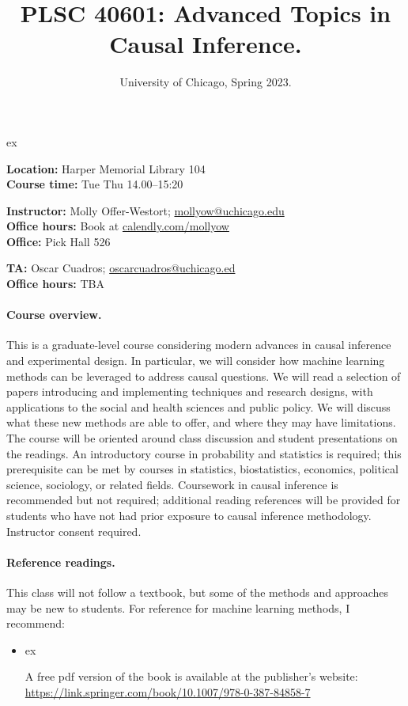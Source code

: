 \documentclass[letterpaper, 12pt, parskip=full,DIV=10]{scrartcl}
\title{PLSC 40601: Advanced Topics in Causal Inference.}
\subtitle{University of Chicago, Spring 2023.}
\date{}
\author{}
\begin{document}
\maketitle

 ex

\textbf{Location:} Harper Memorial Library 104\\
\textbf{Course time:} Tue Thu 14.00--15:20


\textbf{Instructor:} Molly Offer-Westort; \href{mailto:mollyow@uchicago.edu}{mollyow@uchicago.edu}\\
\textbf{Office hours:} Book at \href{https://calendly.com/mollyow}{calendly.com/mollyow}\\
\textbf{Office:} Pick Hall 526 

\textbf{TA:} Oscar Cuadros; \href{mailto:oscarcuadros@uchicago.edu }{oscarcuadros@uchicago.ed}\\
\textbf{Office hours:} TBA


\paragraph{Course overview.} This is a graduate-level course considering modern advances in causal inference and experimental design. In particular, we will consider how machine learning methods can be leveraged to address causal questions. We will read a selection of papers introducing and implementing techniques and research designs, with applications to the social and health sciences and public policy. We will discuss what these new methods are able to offer, and where they may have limitations. The course will be oriented around class discussion and student presentations on the readings. An introductory course in probability and statistics is required; this prerequisite can be met by courses in statistics, biostatistics, economics, political science, sociology, or related fields. Coursework in causal inference is recommended but not required; additional reading references will be provided for students who have not had prior exposure to causal inference methodology. Instructor consent required.


\paragraph{Reference readings.}
This class will not follow a textbook, but some of the methods and approaches may be new to students. For reference for machine learning methods, I recommend:
\begin{itemize}
\item {}  ex

A free pdf version of the book is available at the publisher's website: \url{https://link.springer.com/book/10.1007/978-0-387-84858-7}
\end{itemize}
\end{document}
